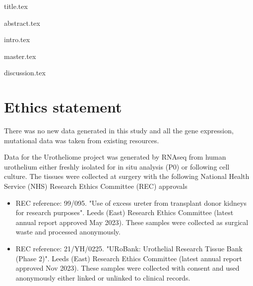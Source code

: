 \documentclass[a4paper, 12pt]{report}
\begin{document}
{title.tex}



\setcounter{tocdepth}{4}





{abstract.tex}


\tableofcontents
\newpage

\listoffigures
\newpage

\listoftables

\clearpage


\printglossary[nonumberlist]

\printglossary[type=\acronymtype,nonumberlist]
\newpage




{intro.tex}

{master.tex}

{discussion.tex}


\chapter{Ethics statement}

There was no new data generated in this study and all the gene expression, mutational data was taken from existing resources.

Data for the Urotheliome project was generated by RNAseq from human urothelium either freshly isolated for in situ analysis (P0) or following cell culture. The tissues were collected at surgery with the following National Health Service (NHS) Research Ethics Committee (REC) approvals

\begin{itemize}
    \item REC reference: 99/095. "Use of excess ureter from transplant donor kidneys for research purposes". Leeds (East) Research Ethics Committee (latest annual report approved May 2023). These samples were collected as surgical waste and processed anonymously.
    \item REC reference: 21/YH/0225. "URoBank: Urothelial Research Tissue Bank (Phase 2)". Leeds (East) Research Ethics Committee (latest annual report approved Nov 2023). These samples were collected with consent and used anonymously either linked or unlinked to clinical records.  
\end{itemize}
\end{document}
